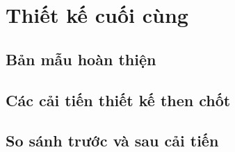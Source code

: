 \section{Thiết kế cuối cùng}

\subsection{Bản mẫu hoàn thiện}

\subsection{Các cải tiến thiết kế then chốt}

\subsection{So sánh trước và sau cải tiến}

